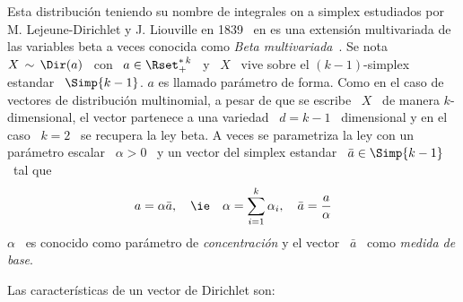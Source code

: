 \label{Sssec:MP:Dirichlet}

Esta distribuci\'on teniendo su nombre de integrales on a simplex estudiados por
M. Lejeune-Dirichlet y J. Liouville  en 1839~\cite{GupRic01, Dir39, Lio39} en es
una extensi\'on  multivariada de las variables  beta a veces  conocida como {\em
  Beta multivariada}~\cite{OlkRub64}. Se  nota \ $X \, \sim \,  \Dir(a)$ \ con \
$a \in \Rset_+^{*  \, k}$ \ y \  $X$ \ vive sobre el  $(k-1)$-simplex estandar \
$\Simp{k-1}$.  $a$ es  llamado par\'ametro de forma. Como en  el caso de vectores
de  distribuci\'on multinomial, a  pesar de  que se  escribe \  $X$ \  de manera
$k$-dimensional, el vector partenece a una  variedad \ $d = k-1$ \ dimensional y
en el caso  \ $k = 2$ \ se  recupera la ley beta. A veces  se parametriza la ley
con un  par\'ametro escalar \ $\alpha  > 0$ \ y  un vector del  simplex estandar \
$\bar{a} \in \Simp{k-1}$ \ tal que
%
\[
a = \alpha \bar{a}, \quad \mbox{\ie} \quad \alpha = \sum_{i=1}^k \alpha_i, \quad
\bar{a} = \frac{a}{\alpha}
\]
%
$\alpha$ \  es conocido como  par\'ametro de {\em  concentraci\'on} y el  vector \
$\bar{a}$ \ como {\em medida de base}.

Las caracter\'isticas de un vector de Dirichlet son:

